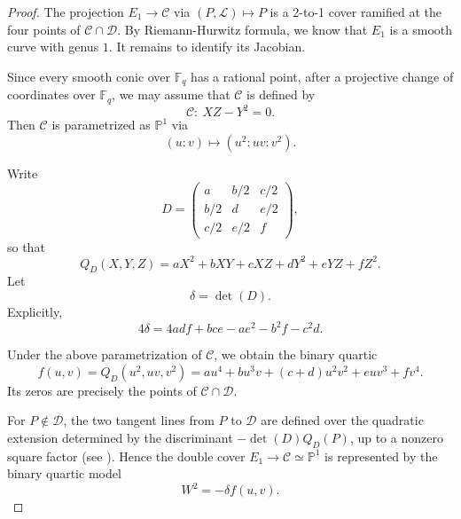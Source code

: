 \documentclass[11pt]{article}
\theoremstyle{definition}
\theoremstyle{definition}
\begin{document}
\begin{proof}
The projection $E_1\to \mathcal C$ via $(P, \mathcal L)\mapsto P$ is a 2-to-1 cover ramified at the four points of  $\mathcal{C}\cap \mathcal{D}$.  By Riemann-Hurwitz formula, we know that $E_1$ is a smooth curve with genus $1$. It remains to identify its Jacobian.

Since every smooth conic over $\mathbb F_q$ has a rational point, after a projective change of coordinates over $\mathbb{F}_q$, we may assume that $\mathcal{C}$ is defined by 
$$\mathcal C:\ XZ-Y^2=0.$$
Then $\mathcal C$ is parametrized as $\mathbb{P}^1$ via
$$(u:v)\mapsto (u^2:uv:v^2).$$

Write
$$
D=
\begin{pmatrix}
a&b/2&c/2\\
b/2&d&e/2\\
c/2&e/2&f
\end{pmatrix},
$$
so that
$$Q_D(X,Y,Z)=aX^2+bXY+cXZ+dY^2+eYZ+fZ^2.$$
Let
$$\delta=\det(D).$$
Explicitly,
$$4\delta=4adf+bce-ae^2-b^2f-c^2d.$$

Under the above parametrization of $\mathcal C$, we obtain the binary quartic
$$
f(u,v)=Q_D(u^2,uv,v^2)
=au^4+bu^3v+(c+d)u^2v^2+euv^3+fv^4.
$$
Its zeros are precisely the points of $\mathcal C\cap\mathcal D$.

For $P\notin\mathcal D$, the two tangent lines from $P$ to $\mathcal D$ are
defined over the quadratic extension determined by the discriminant
$-\det(D)Q_D(P)$, up to a nonzero square factor (see
\cite[Lemma~2.4]{Asgarli}). Hence the double cover $E_1\to\mathcal C\simeq
\mathbb P^1$ is represented by the binary quartic model
$$W^2=-\delta f(u,v).$$


\end{proof}
\end{document}
